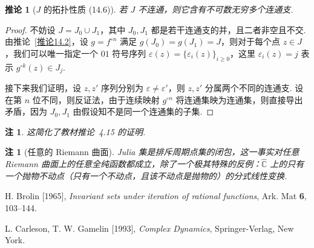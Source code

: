 \documentclass[11pt, a4paper, oneside]{ctexart}
\newtheorem{corollary}[theorem]{推论}
\newtheorem{remark}[theorem]{注}
\newcommand{\C}{\mathbb{C}}
\begin{document}
    \begin{corollary}[$J$ 的拓扑性质 (14.6)]
        若 $J$ 不连通，则它含有不可数无穷多个连通支.
    \end{corollary}
    \begin{proof}
        不妨设 $J=J_0\cup J_1$，其中 $J_0,J_1$ 都是若干连通支的并，且二者非空且不交. 由推论~\ref{推论14.2}，设 $g=f^{\circ n}$ 满足 $g(J_0)=g(J_1)=J$，则对于每个点 $z\in J$，我们可以唯一指定一个 $01$ 符号序列 $\varepsilon(z)={\{\varepsilon_i(z)\}}_{i\geq 0}$，这里 $\varepsilon_i(z)=j$ 表示 $g^{\circ k}(z)\in J_j$.

        接下来我们证明，设 $z,z'$ 序列分别为 $\varepsilon\neq \varepsilon'$，则 $z,z'$ 分属两个不同的连通支. 设在第 $n$ 位不同，则反证法，由于连续映射 $g^{\circ n}$ 将连通集映为连通集，则直接导出矛盾，因为 $J_0,J_1$ 由假设知不是同一个连通集的子集.
    \end{proof}
    \begin{remark}
        这简化了教材推论~4.15 的证明.
    \end{remark}

    \begin{remark}[任意的 Riemann 曲面]
        Julia 集是排斥周期点集的闭包，这一事实对任意 Riemann 曲面上的任意全纯函数都成立，除了一个极其特殊的反例：$\hat{\C}$ 上的只有一个抛物不动点（只有一个不动点，且该不动点是抛物的）的分式线性变换.
    \end{remark}

    \begin{thebibliography}{}
        H. Brolin [1965], \emph{Invariant sets under iteration of rational functions}, Ark. Mat \textbf{6}, 103--144.
        
        L. Carleson, T. W. Gamelin [1993], \emph{Complex Dynamics}, Springer-Verlag, New York.
    \end{thebibliography}
\end{document}
